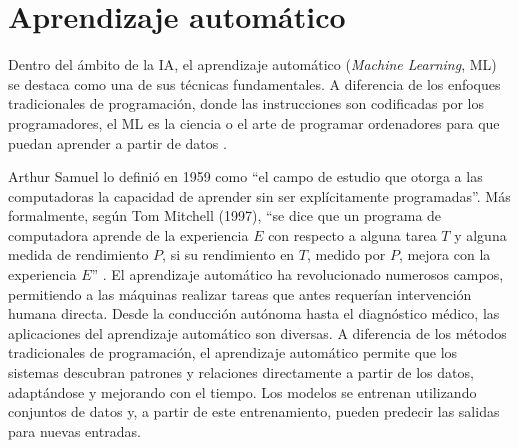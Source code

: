 \section{Aprendizaje automático}

Dentro del ámbito de la IA, el aprendizaje automático (\textit{Machine Learning}, ML) se destaca como una de sus técnicas fundamentales. A diferencia de los enfoques tradicionales de programación, donde las instrucciones son codificadas por los programadores, el ML es la ciencia o el arte de programar ordenadores para que puedan aprender a partir de datos \citep{knuth1997art}.

Arthur Samuel lo definió en 1959 como ``el campo de estudio que otorga a las computadoras la capacidad de aprender sin ser explícitamente programadas''\citep{geron2022hands}. Más formalmente, según Tom Mitchell (1997), ``se dice que un programa de computadora aprende de la experiencia \(E\) con respecto a alguna tarea \(T\) y alguna medida de rendimiento \(P\), si su rendimiento en \(T\), medido por \(P\), mejora con la experiencia \(E\)'' \citep{geron2022hands}. El aprendizaje automático ha revolucionado numerosos campos, permitiendo a las máquinas realizar tareas que antes requerían intervención humana directa. Desde la conducción autónoma hasta el diagnóstico médico, las aplicaciones del aprendizaje automático son diversas. A diferencia de los métodos tradicionales de programación, el aprendizaje automático permite que los sistemas descubran patrones y relaciones directamente a partir de los datos, adaptándose y mejorando con el tiempo. Los modelos se entrenan utilizando conjuntos de datos y, a partir de este entrenamiento, pueden predecir las salidas para nuevas entradas.


